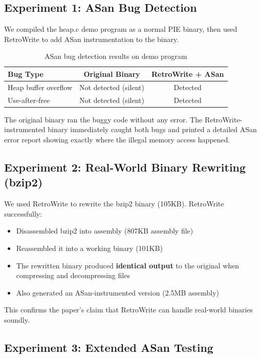 \documentclass[10pt,a4paper]{article}
\begin{document}
\subsection{Experiment 1: ASan Bug Detection}

We compiled the heap.c demo program as a normal PIE binary, then used RetroWrite to add ASan instrumentation to the binary.

\begin{table}[H]
\centering
\caption{ASan bug detection results on demo program}
\label{tab:asan_results}
\begin{tabular}{lcc}
\toprule
\textbf{Bug Type} & \textbf{Original Binary} & \textbf{RetroWrite + ASan} \\
\midrule
\rowcolor{rowgray} Heap buffer overflow & \textcolor{danger}{Not detected (silent)} & \textcolor{success}{Detected} \\
Use-after-free & \textcolor{danger}{Not detected (silent)} & \textcolor{success}{Detected} \\
\bottomrule
\end{tabular}
\end{table}

The original binary ran the buggy code without any error. The RetroWrite-instrumented binary immediately caught both bugs and printed a detailed ASan error report showing exactly where the illegal memory access happened.

\subsection{Experiment 2: Real-World Binary Rewriting (bzip2)}

We used RetroWrite to rewrite the bzip2 binary (105KB). RetroWrite successfully:
\begin{itemize}
    \item Disassembled bzip2 into assembly (807KB assembly file)
    \item Reassembled it into a working binary (101KB)
    \item The rewritten binary produced \textbf{identical output} to the original when compressing and decompressing files
    \item Also generated an ASan-instrumented version (2.5MB assembly)
\end{itemize}

This confirms the paper's claim that RetroWrite can handle real-world binaries soundly.

\subsection{Experiment 3: Extended ASan Testing}
\end{document}
